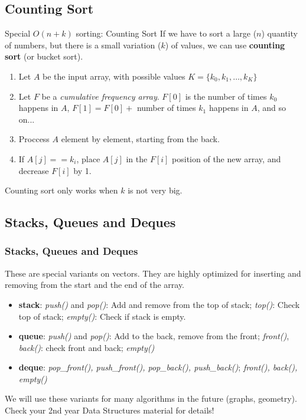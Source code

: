 \subsection{Counting Sort}
\begin{frame}{Special $O(n + k)$ sorting: Counting Sort}
  If we have to sort a large ($n$) quantity of numbers, but there is a small variation ($k$) of values, we can use {\bf counting sort} (or bucket sort).\medskip

  \begin{enumerate}
    \item Let $A$ be the input array, with possible values $K = \{k_0, k_1, \ldots, k_K\}$
    \item Let $F$ be a \emph{cumulative frequency array}. $F[0]$ is the number of times $k_0$ happens in $A$, $F[1] = F[0] +$ number of times $k_1$ happens in $A$, and so on...

    \item Proccess $A$ element by element, starting from the back.
    \item If $A[j] == k_i$, place $A[j]$ in the $F[i]$ position of the new array, and decrease $F[i]$ by 1.
  \end{enumerate}\bigskip

  Counting sort only works when $k$ is not very big.

\end{frame}


\subsection{Stacks, Queues and Deques}
\begin{frame}
  \frametitle{Stacks, Queues and Deques}

  These are special variants on vectors. They are highly optimized for inserting and removing from the start and the end of the array.\bigskip

  \begin{itemize}
    \item {\bf stack}: \emph{push()} and \emph{pop()}: Add and remove from the top of stack; \emph{top()}: Check top of stack; \emph{empty()}: Check if stack is empty.\medskip

    \item {\bf queue}: \emph{push()} and \emph{pop()}: Add to the back, remove from the front; \emph{front()}, \emph{back()}: check front and back; \emph{empty()}
    \medskip

    \item {\bf deque}: \emph{pop\_front(), push\_front(), pop\_back(), push\_back()}; \emph{front(), back(), empty()}
  \end{itemize}
  \bigskip

  \begin{block}{}
    We will use these variants for many algorithms in the future (graphs, geometry). Check your 2nd year Data Structures material for details!
  \end{block}
\end{frame}

